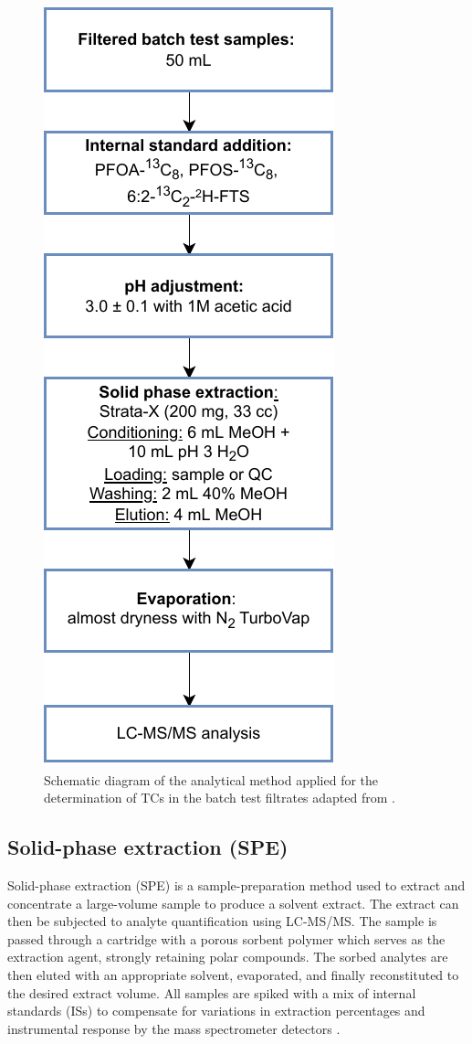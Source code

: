 \begin{figure}
    \centering
    \includegraphics{Diagrams/Methods-Analytical_method.pdf}
    \caption{Schematic diagram of the analytical method applied for the determination of TCs in the batch test filtrates adapted from \cite{arvaniti2012diagram}.}
    \label{fig:analyticalMethod}
\end{figure}

\subsection{Solid-phase extraction (SPE)}
Solid-phase extraction (\acrshort{SPE}) is a sample-preparation method used to extract and concentrate a large-volume sample to produce a solvent extract. The extract can then be subjected to analyte quantification using LC-MS/MS. The sample is passed through a cartridge with a porous sorbent polymer which serves as the extraction agent, strongly retaining polar compounds. The sorbed analytes are then eluted with an appropriate solvent, evaporated, and finally reconstituted to the desired extract volume. All samples are spiked with a mix of internal standards (\acrshort{IS}s) to compensate for variations in extraction percentages and instrumental response by the mass spectrometer detectors \citep{arvaniti2014}.

